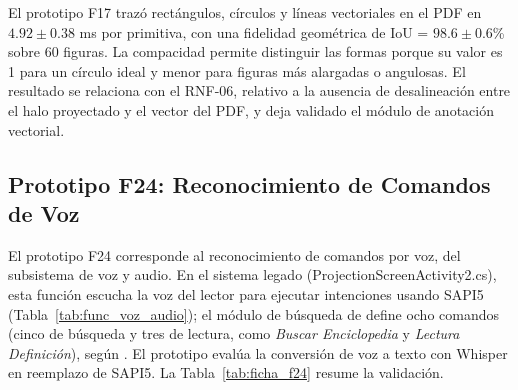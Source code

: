El prototipo F17 trazó rectángulos, círculos y líneas vectoriales en el PDF en $4.92 \pm 0.38$ ms por primitiva, con una fidelidad geométrica de IoU = $98.6 \pm 0.6$\% sobre 60 figuras. La compacidad permite distinguir las formas porque su valor es 1 para un círculo ideal y menor para figuras más alargadas o angulosas. El resultado se relaciona con el RNF-06, relativo a la ausencia de desalineación entre el halo proyectado y el vector del PDF, y deja validado el módulo de anotación vectorial.
 
\subsection{Prototipo F24: Reconocimiento de Comandos de Voz}
 
El prototipo F24 corresponde al reconocimiento de comandos por voz, del subsistema de voz y audio. En el sistema legado (ProjectionScreenActivity2.cs), esta función escucha la voz del lector para ejecutar intenciones usando SAPI5 (Tabla~\ref{tab:func_voz_audio}); el módulo de búsqueda de \cite{montanares2019desarrollo} define ocho comandos (cinco de búsqueda y tres de lectura, como \textit{Buscar Enciclopedia} y \textit{Lectura Definición}), según \cite{ibaceta2023evaluacion}. El prototipo evalúa la conversión de voz a texto con Whisper en reemplazo de SAPI5. La Tabla~\ref{tab:ficha_f24} resume la validación.
 
